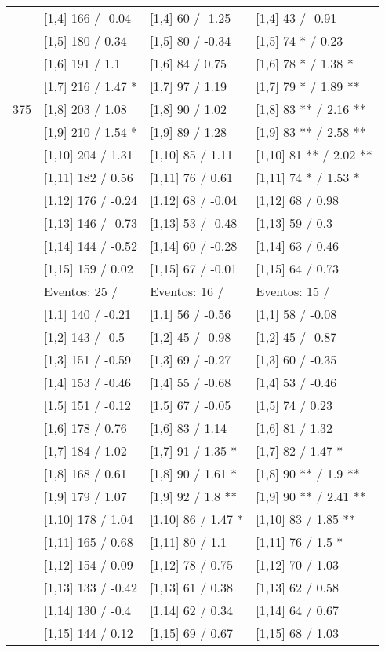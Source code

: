 \begin{table}
\begin{tabular}[t]{llll}
\addlinespace
 & {}[1,4] 166  / -0.04 & {}[1,4] 60  / -1.25 & {}[1,4] 43  / -0.91\\
 & {}[1,5] 180  / 0.34 & {}[1,5] 80  / -0.34 & {}[1,5] 74 * / 0.23\\
 & {}[1,6] 191  / 1.1 & {}[1,6] 84  / 0.75 & {}[1,6] 78 * / 1.38 *\\
 & {}[1,7] 216  / 1.47 * & {}[1,7] 97  / 1.19 & {}[1,7] 79 * / 1.89 **\\
375 & {}[1,8] 203  / 1.08 & {}[1,8] 90  / 1.02 & {}[1,8] 83 ** / 2.16 **\\
\addlinespace
 & {}[1,9] 210  / 1.54 * & {}[1,9] 89  / 1.28 & {}[1,9] 83 ** / 2.58 **\\
 & {}[1,10] 204  / 1.31 & {}[1,10] 85  / 1.11 & {}[1,10] 81 ** / 2.02 **\\
 & {}[1,11] 182  / 0.56 & {}[1,11] 76  / 0.61 & {}[1,11] 74 * / 1.53 *\\
 & {}[1,12] 176  / -0.24 & {}[1,12] 68  / -0.04 & {}[1,12] 68  / 0.98\\
 & {}[1,13] 146  / -0.73 & {}[1,13] 53  / -0.48 & {}[1,13] 59  / 0.3\\
\addlinespace
 & {}[1,14] 144  / -0.52 & {}[1,14] 60  / -0.28 & {}[1,14] 63  / 0.46\\
 & {}[1,15] 159  / 0.02 & {}[1,15] 67  / -0.01 & {}[1,15] 64  / 0.73\\
 & Eventos:  25 / & Eventos:  16 / & Eventos:  15 /\\
 & {}[1,1] 140  / -0.21 & {}[1,1] 56  / -0.56 & {}[1,1] 58  / -0.08\\
 & {}[1,2] 143  / -0.5 & {}[1,2] 45  / -0.98 & {}[1,2] 45  / -0.87\\
\addlinespace
 & {}[1,3] 151  / -0.59 & {}[1,3] 69  / -0.27 & {}[1,3] 60  / -0.35\\
 & {}[1,4] 153  / -0.46 & {}[1,4] 55  / -0.68 & {}[1,4] 53  / -0.46\\
 & {}[1,5] 151  / -0.12 & {}[1,5] 67  / -0.05 & {}[1,5] 74  / 0.23\\
 & {}[1,6] 178  / 0.76 & {}[1,6] 83  / 1.14 & {}[1,6] 81  / 1.32\\
 & {}[1,7] 184  / 1.02 & {}[1,7] 91  / 1.35 * & {}[1,7] 82  / 1.47 *\\
\addlinespace
500 & {}[1,8] 168  / 0.61 & {}[1,8] 90  / 1.61 * & {}[1,8] 90 ** / 1.9 **\\
 & {}[1,9] 179  / 1.07 & {}[1,9] 92  / 1.8 ** & {}[1,9] 90 ** / 2.41 **\\
 & {}[1,10] 178  / 1.04 & {}[1,10] 86  / 1.47 * & {}[1,10] 83  / 1.85 **\\
 & {}[1,11] 165  / 0.68 & {}[1,11] 80  / 1.1 & {}[1,11] 76  / 1.5 *\\
 & {}[1,12] 154  / 0.09 & {}[1,12] 78  / 0.75 & {}[1,12] 70  / 1.03\\
\addlinespace
 & {}[1,13] 133  / -0.42 & {}[1,13] 61  / 0.38 & {}[1,13] 62  / 0.58\\
 & {}[1,14] 130  / -0.4 & {}[1,14] 62  / 0.34 & {}[1,14] 64  / 0.67\\
 & {}[1,15] 144  / 0.12 & {}[1,15] 69  / 0.67 & {}[1,15] 68  / 1.03\\
\bottomrule
\end{tabular}
\end{table}
